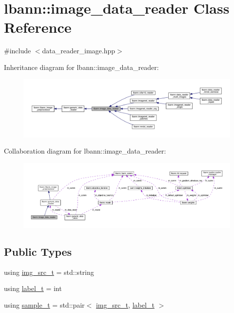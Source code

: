 \hypertarget{classlbann_1_1image__data__reader}{}\section{lbann\+:\+:image\+\_\+data\+\_\+reader Class Reference}
\label{classlbann_1_1image__data__reader}


{\ttfamily \#include $<$data\+\_\+reader\+\_\+image.\+hpp$>$}



Inheritance diagram for lbann\+:\+:image\+\_\+data\+\_\+reader\+:\nopagebreak
\begin{figure}[H]
\begin{center}
\leavevmode
\includegraphics[width=350pt]{classlbann_1_1image__data__reader__inherit__graph}
\end{center}
\end{figure}


Collaboration diagram for lbann\+:\+:image\+\_\+data\+\_\+reader\+:\nopagebreak
\begin{figure}[H]
\begin{center}
\leavevmode
\includegraphics[width=350pt]{classlbann_1_1image__data__reader__coll__graph}
\end{center}
\end{figure}
\subsection*{Public Types}
\begin{DoxyCompactItemize}
\item 
using \hyperlink{classlbann_1_1image__data__reader_acd2b41459e901a3aed39fd3be7270fa2}{img\+\_\+src\+\_\+t} = std\+::string
\item 
using \hyperlink{classlbann_1_1image__data__reader_a7645f17852c990e80b1530509ff5e87c}{label\+\_\+t} = int
\item 
using \hyperlink{classlbann_1_1image__data__reader_a7580011ef6ef9da32e1a3bc49ad0706c}{sample\+\_\+t} = std\+::pair$<$ \hyperlink{classlbann_1_1image__data__reader_acd2b41459e901a3aed39fd3be7270fa2}{img\+\_\+src\+\_\+t}, \hyperlink{classlbann_1_1image__data__reader_a7645f17852c990e80b1530509ff5e87c}{label\+\_\+t} $>$
\end{DoxyCompactItemize}
